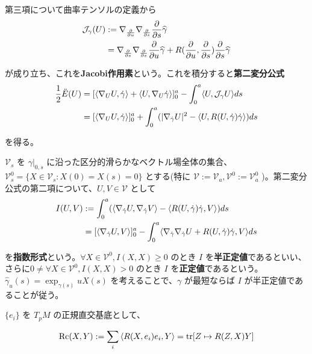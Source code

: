 \documentclass[dvipdfmx,a4paper]{jsreport}
\theoremstyle{definition}
\newcommand{\der}{\partial}
\renewcommand{\hat}{\widehat}
\newcommand{\Rc}{{\rm Rc}}
\begin{document}
第三項について曲率テンソルの定義から 
\begin{align*}
    \mathcal{J}_{\gamma}(U) &:=\nabla_{\der \over \der u} \nabla_{\der \over \der s}{\der \over \der s}\hat{\gamma} \\
    &=\nabla_{\der \over \der s} \nabla_{\der \over \der s}{\der \over \der u}\hat{\gamma}+R({\der \over \der u},{\der \over \der s}){\der \over \der s}\hat{\gamma}    
\end{align*}

が成り立ち、これを\textbf{Jacobi作用素}という。これを積分すると\textbf{第二変分公式}
\begin{align*}
    {1 \over 2}\ddot{E}(U) &= [\langle \nabla_{U}U,\dot{\gamma} \rangle
    +\langle U,\nabla_{U}\dot{\gamma} \rangle]_0^a
    -\int_0^a \langle U,\mathcal{J}_{\gamma} U \rangle ds \\
    &= [\langle \nabla_{U}U,\dot{\gamma} \rangle
    ]_0^a
    +\int_0^a (| \nabla_{\dot{\gamma}}U|^2-\langle U,R(U,\dot{\gamma})\dot{\gamma} \rangle) ds
\end{align*}

を得る。

$\mathcal{V}_s$ を $\gamma|_{0,s}$ に沿った区分的滑らかなベクトル場全体の集合、$\mathcal{V}^0_s=\{X\in \mathcal{V}_s \colon X(0)=X(s)=0\}$ とする(特に $\mathcal{V}:=\mathcal{V}_a,\mathcal{V}^0:=\mathcal{V}^0_a$ )。第二変分公式の第二項について、$U,V\in \mathcal{V}$ として
\begin{align*}
    I(U,V) &:=\int_0^a (\langle \nabla_{\dot{\gamma}} U, \nabla_{\dot{\gamma}} V \rangle-\langle R(U,\dot{\gamma})\dot{\gamma} ,V\rangle) ds \\
    &=[\ev{\nabla_{\dot{\gamma}}U,V}]_0^a -\int_0^a \langle \nabla_{\dot{\gamma}}\nabla_{\dot{\gamma}}U+R(U,\dot{\gamma})\dot{\gamma} ,V \rangle ds \\
\end{align*}

を\textbf{指数形式}という。$\forall X \in \mathcal{V}^0,I(X,X) \geq 0$ のとき $I$ を\textbf{半正定値}であるといい、さらに$0\neq \forall X \in \mathcal{V}^0,I(X,X) >0$ のとき $I$ を\textbf{正定値}であるという。$\hat{\gamma}_u(s)=\exp_{\gamma(s)}uX(s)$ を考えることで、$\gamma$ が最短ならば $I$ が半正定値であることが従う。

$\{e_i\}$ を $T_pM$ の正規直交基底として、

\begin{align*}
    \Rc(X,Y):=\sum_i \ev{R(X,e_i)e_i,Y}=\tr[Z \mapsto R(Z,X)Y]
\end{align*}
\end{document}
